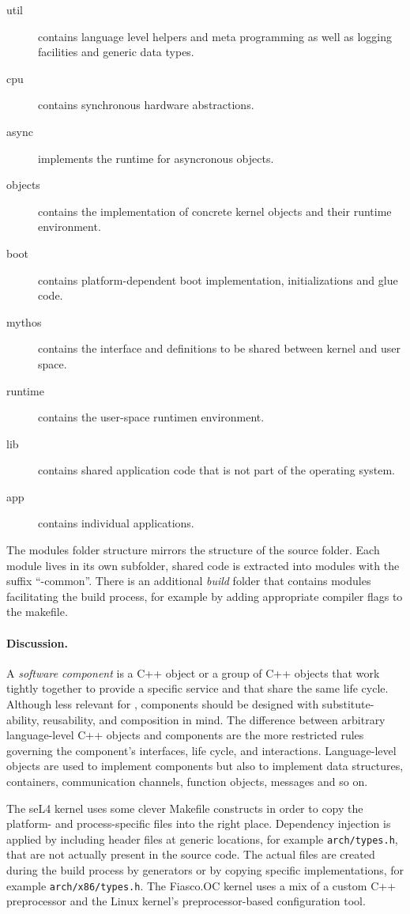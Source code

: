\begin{description}
\item[util] contains language level helpers and meta programming as well as logging facilities and generic data types.
\item[cpu] contains synchronous hardware abstractions.
\item[async] implements the runtime for asyncronous objects.
\item[objects] contains the implementation of concrete kernel objects and their runtime environment.
\item[boot] contains platform-dependent boot implementation, initializations and glue code.
\item[mythos] contains the interface  and definitions to be shared between kernel and user space.

\item[runtime] contains the user-space runtimen environment.
\item[lib] contains shared application code that is not part of the operating system.
\item[app] contains individual applications.
\end{description}

The modules folder structure mirrors the structure of the source folder. Each module lives in its own subfolder, shared code is extracted into modules with the suffix ``-common''. There is an additional \emph{build} folder that contains modules facilitating the build process, for example by adding appropriate compiler flags to the makefile.

\paragraph{Discussion.}
A \emph{software component} is a C++ object or a group of C++ objects that work
tightly together to provide a specific service and that share the same life cycle.
Although less relevant for \mythos, components should be designed with substitute-ability, reusability, and composition in mind. 
The difference between arbitrary language-level C++ objects and components are the more restricted rules governing the component's interfaces, life cycle, and interactions. Language-level objects are used to implement components but also to implement data structures, containers, communication channels, function objects, messages and so on.

The seL4 kernel uses some clever Makefile constructs in order to copy the platform- and process-specific files into the right place. Dependency injection is applied by including header files at generic locations, for example \texttt{arch/types.h}, that are not actually present in the source code. The actual files are created during the build process by generators or by copying specific implementations, for example \texttt{arch/x86/types.h}. 
%
The Fiasco.OC kernel uses a mix of a custom C++ preprocessor and the Linux kernel's preprocessor-based configuration tool. 

